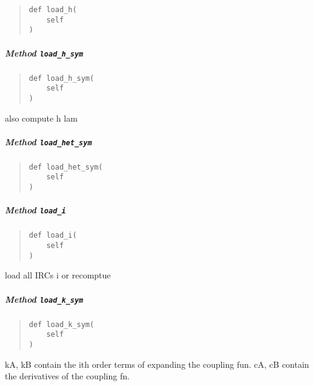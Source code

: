 \documentclass[english,a4paper,oneside]{article}
\let\oldsubparagraph\subparagraph
\renewcommand{\subparagraph}[1]{\oldsubparagraph{#1}\mbox{}}
\begin{document}
\begin{quote}
\begin{verbatim}
def load_h(
    self
)
\end{verbatim}
\end{quote}

\hypertarget{StrongCoupling.StrongCoupling.load_h_sym}{%
\subparagraph{\texorpdfstring{Method
\texttt{load\_h\_sym}}{Method load\_h\_sym}}\label{StrongCoupling.StrongCoupling.load_h_sym}}

\begin{quote}
\begin{verbatim}
def load_h_sym(
    self
)
\end{verbatim}
\end{quote}

also compute h lam

\hypertarget{StrongCoupling.StrongCoupling.load_het_sym}{%
\subparagraph{\texorpdfstring{Method
\texttt{load\_het\_sym}}{Method load\_het\_sym}}\label{StrongCoupling.StrongCoupling.load_het_sym}}

\begin{quote}
\begin{verbatim}
def load_het_sym(
    self
)
\end{verbatim}
\end{quote}

\hypertarget{StrongCoupling.StrongCoupling.load_i}{%
\subparagraph{\texorpdfstring{Method
\texttt{load\_i}}{Method load\_i}}\label{StrongCoupling.StrongCoupling.load_i}}

\begin{quote}
\begin{verbatim}
def load_i(
    self
)
\end{verbatim}
\end{quote}

load all IRCs i or recomptue

\hypertarget{StrongCoupling.StrongCoupling.load_k_sym}{%
\subparagraph{\texorpdfstring{Method
\texttt{load\_k\_sym}}{Method load\_k\_sym}}\label{StrongCoupling.StrongCoupling.load_k_sym}}

\begin{quote}
\begin{verbatim}
def load_k_sym(
    self
)
\end{verbatim}
\end{quote}

kA, kB contain the ith order terms of expanding the coupling fun. cA, cB
contain the derivatives of the coupling fn.
\end{document}

